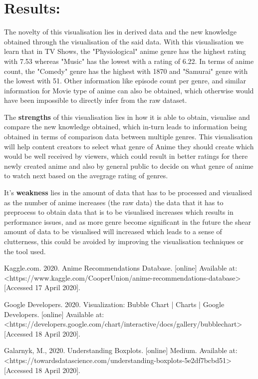 \documentclass[a4paper, 10pt]{article}
\begin{document}
\section{Results:}
    \qquad The novelty of this visualisation lies in derived data and the new knowledge obtained through the visualisation of the said data. With this visualisation we learn that in TV Shows, the "Physiological" anime genre has the highest rating with 7.53 whereas "Music" has the lowest with a rating of 6.22. In terms of anime count, the "Comedy" genre has the highest with 1870 and "Samurai" genre with the lowest with 51. Other information like episode count per genre, and similar information for Movie type of anime can also be obtained, which otherwise would have been impossible to directly infer from the raw dataset.

    \qquad The \textbf{strengths} of this visualisation lies in how it is able to obtain, visualise and compare the new knowledge obtained, which in-turn leads to information being obtained in terms of comparison data between multiple genres. This visualisation will help content creators to select what genre of Anime they should create which would be well received by viewers, which could result in better ratings for there newly created anime and also by general public to decide on what genre of anime to watch next based on the avegrage rating of genres.
    
    \qquad It's \textbf{weakness} lies in the amount of data that has to be processed and visualised as the number of anime increases (the raw data) the data that it has to preprocess to obtain data that is to be visualised increases which results in performance issues, and as more genre become significant in the future the shear amount of data to be visualised will increased which leads to a sense of clutterness, this could be avoided by improving the visualisation techniques or the tool used. 

\begin{thebibliography}{9}
Kaggle.com. 2020. Anime Recommendations Database. [online] Available at: <https://www.kaggle.com/CooperUnion/anime-recommendations-database> [Accessed 17 April 2020].

Google Developers. 2020. Visualization: Bubble Chart  |  Charts  |  Google Developers. [online] Available at: <https://developers.google.com/chart/interactive/docs/gallery/bubblechart> [Accessed 18 April 2020].

Galarnyk, M., 2020. Understanding Boxplots. [online] Medium. Available at: <https://towardsdatascience.com/understanding-boxplots-5e2df7bcbd51> [Accessed 18 April 2020].

\end{thebibliography}
\end{document}
